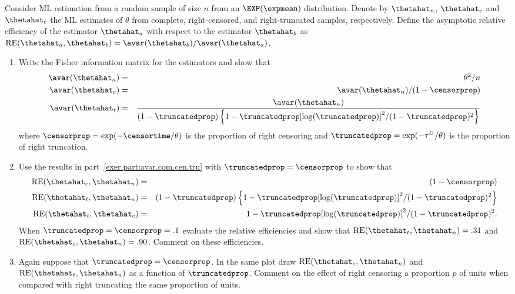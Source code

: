 \begin{exercise1}
\label{exercise:trunc.releff.avar}
Consider ML estimation from a random sample of size $n$
from 
an $\EXP(\expmean)$ distribution. Denote by $\thetahat_{n}$, $\thetahat_{c}$
and $\thetahat_{t}$ the ML estimates of $\theta$ from 
complete, right-censored, and right-truncated samples,
respectively. 
Define
the asymptotic relative efficiency of the
estimator $\thetahat_{a}$  with respect to the 
estimator $\thetahat_{b}$ as
$\mbox{RE}(\thetahat_{a},\thetahat_{b})=\avar(\thetahat_{b})/
\avar(\thetahat_{a})$.
\begin{enumerate}
\item
\label{exer.part:avar.com.cen.tru}
Write the Fisher information matrix for the estimators and show that
\begin{eqnarray*}
\avar(\thetahat_{n})&=&\theta^{2}/n
\\
\avar(\thetahat_{c})&=&\avar(\thetahat_{n})/(1-\censorprop)
\\
\avar(\thetahat_{t})&=&\frac{\avar(\thetahat_{n})}
		            {
(1-\truncatedprop) \left \{
                   1-\truncatedprop [\log(\truncatedprop)]^{2}/
	           (1-\truncatedprop)^{2}
		   \right \}
                            }
\end{eqnarray*}
where $\censorprop=\exp(-\censortime/\theta)$ is the
proportion of right censoring and 
$\truncatedprop=\exp(-\tau^{U}/\theta)$ is the proportion
of right truncation.
\item
Use the results in part~\ref{exer.part:avar.com.cen.tru} 
with $\truncatedprop=\censorprop$ to
show that
\begin{eqnarray*}
\mbox{RE}(\thetahat_{c},\thetahat_{n})&=&(1-\censorprop)
\\
\mbox{RE}(\thetahat_{t},\thetahat_{n})&=&(1-\truncatedprop) \left \{
                   1-\truncatedprop [\log(\truncatedprop)]^{2}/
	           (1-\truncatedprop)^{2}
		   \right \}
\\
\mbox{RE}(\thetahat_{t},\thetahat_{c})&=&
                   1-\truncatedprop [\log(\truncatedprop)]^{2}/
	           (1-\truncatedprop)^{2}.
\end{eqnarray*}
When $\truncatedprop=\censorprop=.1$ evaluate the
relative efficiencies and show that
$\mbox{RE}(\thetahat_{t},\thetahat_{n})=.31$
and
$\mbox{RE}(\thetahat_{c},\thetahat_{n})=.90$.
Comment on these efficiencies.
\item
Again suppose that $\truncatedprop=\censorprop$.
In the same plot draw 
$\mbox{RE}(\thetahat_{c},\thetahat_{n})$ and 
$\mbox{RE}(\thetahat_{t},\thetahat_{n})$ as
a function of $\truncatedprop$. Comment
on the effect of right censoring a proportion 
$p$ of units when compared with right truncating
the same proportion of units.
\end{enumerate}
\end{exercise1}

